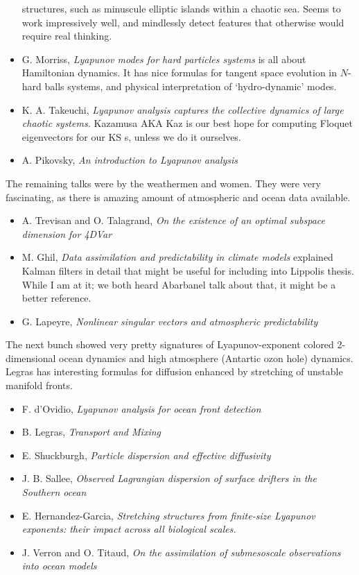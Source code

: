 \begin{itemize}
      structures, such as minuscule elliptic islands
      within a chaotic sea. Seems to work impressively
      well, and mindlessly detect features that
      otherwise would require real thinking.
  \item G. Morriss, {\em Lyapunov modes for hard
      particles systems} is all about Hamiltonian
      dynamics. It has nice formulas for tangent space
      evolution in $N$-hard balls systems, and physical
      interpretation of `hydro-dynamic' modes.
  \item K. A. Takeuchi, {\em Lyapunov analysis captures
      the collective dynamics of large chaotic
      systems.} Kazamusa AKA Kaz is our best hope for
      computing Floquet eigenvectors for our KS \rpo s,
      unless we do it ourselves.

  \item A. Pikovsky, {\em An introduction to Lyapunov
      analysis
        }
  \end{itemize}
The remaining talks were by the weathermen and women. They were
very fascinating, as there is amazing amount of atmospheric and
ocean data available.
  \begin{itemize}
  \item A. Trevisan and O. Talagrand, {\em On the
      existence of an optimal subspace dimension for
        4DVar }
  \item M. Ghil, {\em Data assimilation and predictability
      in climate models} explained Kalman filters in detail
      that might be useful for including into Lippolis
      thesis. While I am at it; we both heard
      Abarbanel talk about that, it might be a
      better reference.
  \item G. Lapeyre, {\em Nonlinear singular vectors and
      atmospheric predictability }
  \end{itemize}
The next bunch showed very pretty signatures of
Lyapunov-exponent colored 2-dimensional ocean dynamics and
high atmosphere (Antartic ozon hole) dynamics. Legras has
interesting formulas for diffusion enhanced by stretching
of unstable manifold fronts.
  \begin{itemize}
  \item F. d'Ovidio, {\em Lyapunov analysis for ocean
      front detection }
  \item B. Legras, {\em Transport and Mixing}
  \item E. Shuckburgh, {\em Particle dispersion and
      effective diffusivity }
  \item J. B. Sallee, {\em Observed Lagrangian
      dispersion of surface drifters in the Southern
      ocean }
  \item E. Hernandez-Garcia, {\em Stretching structures
      from finite-size Lyapunov exponents: their impact
      across all biological scales.}
 \item J. Verron and O. Titaud, {\em On the
     assimilation of submesoscale observations into
     ocean models }
  \end{itemize}

